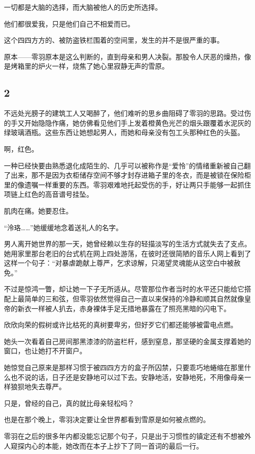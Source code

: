 \documentclass[UTF8, scheme = chinese, openany]{ctexbook}
\begin{document}
一切都是大脑的选择，而大脑被他人的历史所选择。

他们都很爱我，只是他们自己不相爱而已。

这个四四方方的、被防盗铁栏围着的空间里，发生的并不是很严重的事。

原本——零羽原本是这么判断的，直到母亲和男人决裂。那股令人厌恶的燥热，像是烤箱里的炉火一样，烧焦了她心里寂静无声的雪原。

\subsection{2}

不远处光膀子的建筑工人又喝醉了，他们难听的思乡曲阻碍了零羽的思路。受过伤的手又开始隐隐作痛，她仿佛看见他们手上发着橙黄色光芒的烟头跟覆着水泥灰的绿玻璃酒瓶。这些东西让她想起男人，而她和母亲没有包工头那种红色的头盔。

啊，红色。

一种已经快要由熟悉退化成陌生的、几乎可以被称作是“爱怜”的情绪重新被自己翻了出来，那不是因为衣柜储存空间不够才封存进箱子里的冬衣，而是被锁在保险柜里的像遗嘱一样重要的东西。零羽艰难地托起受伤的手，好让两只手能够一起抓住项链上红色的高音谱号挂坠。

肌肉在痛。她要忍住。

“泠珞……”她缓缓地念着送礼人的名字。

男人离开她世界的那一天，她曾经赖以生存的轻描淡写的生活方式就失去了支点。她用家里那台老旧的台式机在网上四处游荡，在彼时还很简陋的音乐人网上看到了这样一个句子：“对暴虐跪献上尊严，乞求谅解，只渴望灵魂能从这空白中被赦免。”

不过是惊鸿一瞥，却让她一下子无所适从。尽管那位作者当时的水平还只能给它搭配上最简单的三和弦，但零羽依然觉得自己一直以来保持的冷静和顺其自然就像皇帝的新衣一样被人扒去，赤身裸体手足无措地暴露在了照亮黑暗的闪电下。

欣欣向荣的假树或许比枯死的真树要卑劣，但好歹它们都还能够被雷电点燃。

她头一次看着自己房间那黑漆漆的防盗栏杆，感到窒息，那坚硬的金属支撑着她的窗口，也让她打不开窗户。

她惊觉自己原来是那样习惯于被四四方方的盒子所囚禁，只要乖巧地蜷缩在那里什么也不说的话，日子还是安静地可以过下去。安静地活，安静地死，不用像母亲一样狼狈地失去尊严。

只是，曾经的自己，真的就比母亲轻松吗？

也是在那个晚上，零羽决定要让全世界都看到雪原是如何被点燃的。

零羽在之后的很多年内都没能忘记那个句子，只是出于习惯性的镇定还有不想被外人窥探内心的本能，她改而在本子上抄下了同一首词的最后一行。
\end{document}
